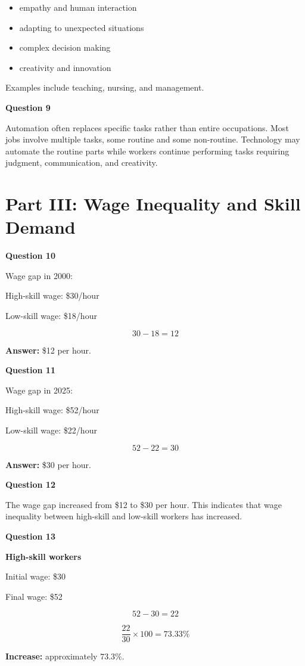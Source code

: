 \documentclass[12pt]{article}
\begin{document}
\begin{itemize}
\item empathy and human interaction
\item adapting to unexpected situations
\item complex decision making
\item creativity and innovation
\end{itemize}

Examples include teaching, nursing, and management.

\textbf{Question 9}

Automation often replaces specific tasks rather than entire occupations. Most jobs involve multiple tasks, some routine and some non-routine. Technology may automate the routine parts while workers continue performing tasks requiring judgment, communication, and creativity.

\section*{Part III: Wage Inequality and Skill Demand}

\textbf{Question 10}

Wage gap in 2000:

High-skill wage: \$30/hour

Low-skill wage: \$18/hour

\[
30 - 18 = 12
\]

\textbf{Answer:} \$12 per hour.

\textbf{Question 11}

Wage gap in 2025:

High-skill wage: \$52/hour

Low-skill wage: \$22/hour

\[
52 - 22 = 30
\]

\textbf{Answer:} \$30 per hour.

\textbf{Question 12}

The wage gap increased from \$12 to \$30 per hour. This indicates that wage inequality between high-skill and low-skill workers has increased.

\textbf{Question 13}

\textbf{High-skill workers}

Initial wage: \$30

Final wage: \$52

\[
52 - 30 = 22
\]

\[
\frac{22}{30} \times 100 = 73.33\%
\]

\textbf{Increase:} approximately $73.3\%$.
\end{document}
